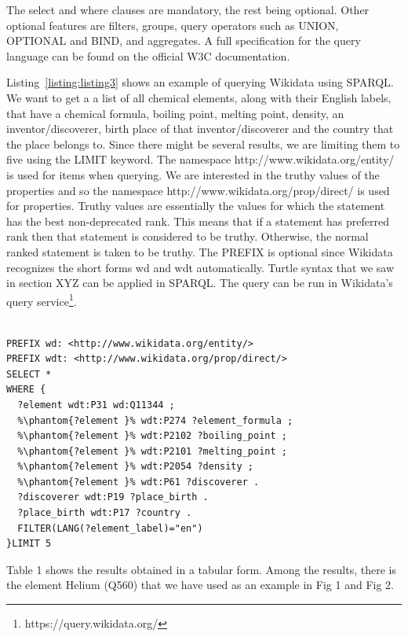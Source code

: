 \documentclass[12 pt, a4paper]{report}
\theoremstyle{definition}
\begin{document}
The select and where clauses are mandatory, the rest being optional. Other optional features are filters, groups, query operators such as UNION, OPTIONAL and BIND, and aggregates. A full specification for the query language can be found on the official W3C documentation\cite{Seaborn}.

Listing~\ref{listing:listing3} shows an example of querying Wikidata using SPARQL. We want to get a a list of all chemical elements, along with their English labels, that have a chemical formula, boiling point, melting point, density, an inventor/discoverer, birth place of that inventor/discoverer and the country that the place belongs to. Since there might be several results, we are limiting them to five using the LIMIT keyword. The namespace http://www.wikidata.org/entity/ is used for items when querying. We are interested in the truthy values of the properties and so the namespace http://www.wikidata.org/prop/direct/ is used for properties. Truthy values are essentially the values for which the statement has the best non-deprecated rank. This means that if a statement has preferred rank then that statement is considered to be truthy. Otherwise, the normal ranked statement is taken to be truthy. The PREFIX is optional since Wikidata recognizes the short forms wd and wdt automatically. Turtle syntax that we saw in section XYZ can be applied in SPARQL. The query can be run in Wikidata's query service\footnote{https://query.wikidata.org/}.  

\begin{minipage}{\linewidth}
\begin{lstlisting}[label=listing:listing3, caption={Querying Wikidata with SPARQL}]

PREFIX wd: <http://www.wikidata.org/entity/>
PREFIX wdt: <http://www.wikidata.org/prop/direct/>
SELECT *
WHERE {
  ?element wdt:P31 wd:Q11344 ;
  %\phantom{?element }% wdt:P274 ?element_formula ; 
  %\phantom{?element }% wdt:P2102 ?boiling_point ;
  %\phantom{?element }% wdt:P2101 ?melting_point ;
  %\phantom{?element }% wdt:P2054 ?density ;
  %\phantom{?element }% wdt:P61 ?discoverer .
  ?discoverer wdt:P19 ?place_birth .
  ?place_birth wdt:P17 ?country .
  FILTER(LANG(?element_label)="en")
}LIMIT 5

\end{lstlisting}
\end{minipage}

Table 1 shows the results obtained in a tabular form. Among the results, there is the element Helium (Q560) that we have used as an example in Fig 1 and Fig 2. 
\end{document}
